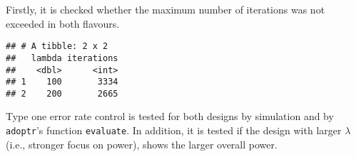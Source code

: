 \documentclass[]{book}
\newenvironment{Shaded}{\begin{snugshade}}{\end{snugshade}}
\newcommand{\DataTypeTok}[1]{\textcolor[rgb]{0.13,0.29,0.53}{#1}}
\newcommand{\KeywordTok}[1]{\textcolor[rgb]{0.13,0.29,0.53}{\textbf{#1}}}
\newcommand{\NormalTok}[1]{#1}
\newcommand{\OperatorTok}[1]{\textcolor[rgb]{0.81,0.36,0.00}{\textbf{#1}}}
\newcommand{\StringTok}[1]{\textcolor[rgb]{0.31,0.60,0.02}{#1}}
\begin{document}
Firstly, it is checked whether the maximum number of iterations was not
exceeded in both flavours.

\begin{Shaded}
\end{Shaded}

\begin{verbatim}
## # A tibble: 2 x 2
##   lambda iterations
##    <dbl>      <int>
## 1    100       3334
## 2    200       2665
\end{verbatim}

Type one error rate control is tested for both designs by simulation and by
\texttt{adoptr}'s function \texttt{evaluate}.
In addition, it is tested if the design with larger \(\lambda\) (i.e.,
stronger focus on power), shows the larger overall power.
\end{document}
